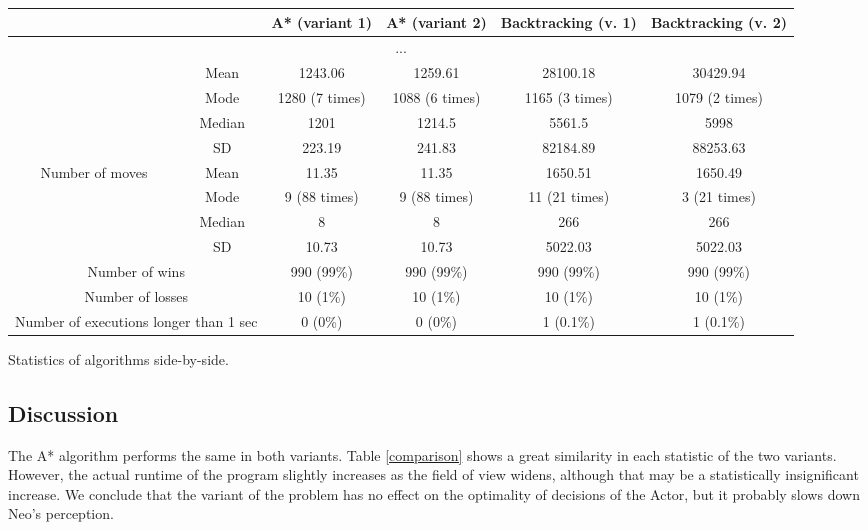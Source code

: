 \documentclass[10pt]{article}
\begin{document}
\begin{longtable}[c]{|c|c|c|c|c|c|}
	\hline
	\multicolumn{2}{|c|}{} & \textbf{A* (variant 1)} & \textbf{A* (variant 2)} & \textbf{Backtracking (v. 1)} & \textbf{Backtracking (v. 2)}\\
	\hline
	\endhead
	\multicolumn{6}{|c|}{...}\\ \endfoot
	\endlastfoot
	\multirow{4}{3cm}{Execution time, $\mu s$} & Mean & 1243.06 & 1259.61 & 28100.18 & 30429.94 \\\cline{2-6}
	& Mode & 1280 (7 times) & 1088 (6 times) & 1165 (3 times) & 1079 (2 times) \\\cline{2-6}
	& Median & 1201 & 1214.5 & 5561.5 & 5998 \\\cline{2-6}
	& SD & 223.19 & 241.83 & 82184.89 & 88253.63 \\\hline
	\multirow{4}{3cm}{Number of moves} & Mean & 11.35 & 11.35 & 1650.51 & 1650.49 \\\cline{2-6}
	& Mode & 9 (88 times) & 9 (88 times) & 11 (21 times) & 3 (21 times) \\\cline{2-6}
	& Median & 8 & 8 & 266 & 266 \\\cline{2-6}
	& SD & 10.73 & 10.73 & 5022.03 & 5022.03 \\\hline
	\multicolumn{2}{|c|}{Number of wins} & 990 (99\%) & 990 (99\%) & 990 (99\%) & 990 (99\%) \\\hline
	\multicolumn{2}{|c|}{Number of losses} & 10 (1\%) & 10 (1\%)  & 10 (1\%) & 10 (1\%) \\\hline
	\multicolumn{2}{|c|}{Number of executions longer than 1 sec} & 0 (0\%) & 0 (0\%) & 1 (0.1\%) & 1 (0.1\%)\\\hline
	
\end{longtable}
\begin{table}[!h]
	\caption{Statistics of algorithms side-by-side.} \label{comparison}
\end{table}

\subsection{Discussion}
The A* algorithm performs the same in both variants. Table \ref{comparison} shows a great similarity in each statistic of the two variants. However, the actual runtime of the program slightly increases as the field of view widens, although that may be a statistically insignificant increase. We conclude that the variant of the problem has no effect on the optimality of decisions of the Actor, but it probably slows down Neo's perception.
\end{document}
